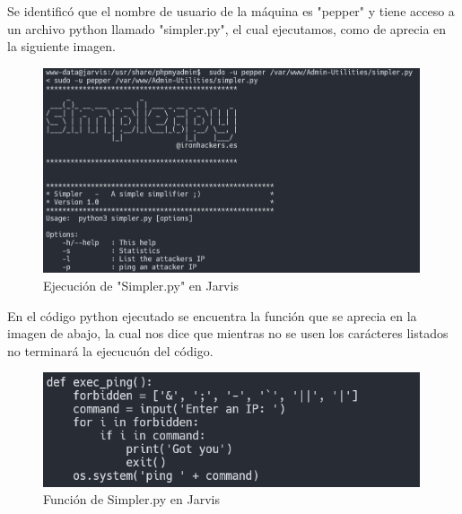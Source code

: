        \large{Se identificó que el nombre de usuario de la máquina es "pepper" y tiene acceso a un archivo python llamado "simpler.py", el cual ejecutamos, como de aprecia en la siguiente imagen.}
        \par
        \begin{figure}[H]
            \centering
            \includegraphics[width=0.99\textwidth]{imagenes/jarvis/14_simpler_python_jarvis.png}
            \caption{Ejecución de "Simpler.py" en Jarvis}
        \end{figure}

        \large{En el código python ejecutado se encuentra la función que se aprecia en la imagen de abajo, la cual nos dice que mientras no se usen los carácteres listados no terminará la ejecucuón del código.}
        \par
        \begin{figure}[H]
            \centering
            \includegraphics[width=0.99\textwidth]{imagenes/jarvis/15_fun_ping_jarvis.png}
            \caption{Función de Simpler.py en Jarvis}
        \end{figure}

